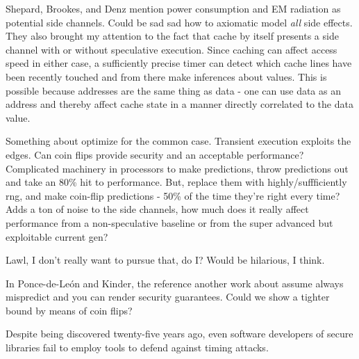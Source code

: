 \documentclass[11pt,conference]{IEEEtran}
\begin{document}
Shepard, Brookes, and Denz \cite{shepherd2022transient} mention power consumption and EM radiation as potential side channels.
Could be sad sad how to axiomatic model \emph{all} side effects.
They also brought my attention to the fact that cache by itself presents a side channel with or without speculative execution.
Since caching can affect access speed in either case, a sufficiently precise timer can detect which cache lines have been recently touched and from there make inferences about values.
This is possible because addresses are the same thing as data - one can use data as an address and thereby affect cache state in a manner directly correlated to the data value.

Something about optimize for the common case.
Transient execution exploits the edges.
Can coin flips provide security and an acceptable performance?
Complicated machinery in processors to make predictions, throw predictions out and take an 80\% hit to performance.
But, replace them with highly/suffficiently rng, and make coin-flip predictions - 50\% of the time they're right every time?
Adds a ton of noise to the side channels, how much does it really affect performance from a non-speculative baseline or from the super advanced but exploitable current gen?

Lawl, I don't really want to pursue that, do I?
Would be hilarious, I think.

In Ponce-de-León and Kinder\cite{cats2022}, the reference another work about assume always mispredict and you can render security guarantees.
Could we show a tighter bound by means of coin flips?


Despite being discovered twenty-five years ago\cite{kocher96}, even software developers of secure libraries fail to employ tools to defend against timing attacks\cite{9833713}.




\end{document}

